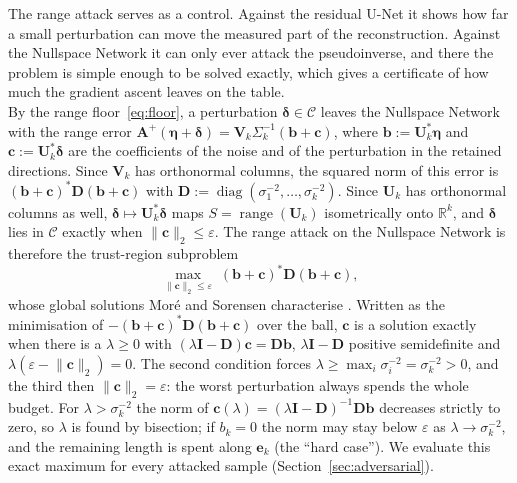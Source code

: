 \documentclass{article}
\numberwithin{equation}{section}
\begin{document}
The range attack serves as a control. Against the residual U-Net it shows how far a small perturbation
can move the measured part of the reconstruction. Against the Nullspace Network it can only ever attack the
pseudoinverse, and there the problem is simple enough to be solved exactly, which gives a certificate of
how much the gradient ascent leaves on the table.\\
By the range floor~\eqref{eq:floor}, a perturbation $\boldsymbol{\delta}\in\mathcal{C}$ leaves the Nullspace
Network with the range error
$\mathbf{A}^{+}(\boldsymbol{\eta}+\boldsymbol{\delta})=\mathbf{V}_k\Sigma_k^{-1}(\mathbf{b}+\mathbf{c})$, where
$\mathbf{b}:=\mathbf{U}_k^{*}\boldsymbol{\eta}$ and $\mathbf{c}:=\mathbf{U}_k^{*}\boldsymbol{\delta}$ are the
coefficients of the noise and of the perturbation in the retained directions. Since $\mathbf{V}_k$ has
orthonormal columns, the squared norm of this error is $(\mathbf{b}+\mathbf{c})^{*}\mathbf{D}(\mathbf{b}+\mathbf{c})$
with $\mathbf{D}:=\operatorname{diag}(\sigma_1^{-2},\dots,\sigma_k^{-2})$. Since $\mathbf{U}_k$ has orthonormal
columns as well, $\boldsymbol{\delta}\mapsto\mathbf{U}_k^{*}\boldsymbol{\delta}$ maps
$S=\operatorname{range}(\mathbf{U}_k)$ isometrically onto $\mathbb{R}^k$, and $\boldsymbol{\delta}$ lies in
$\mathcal{C}$ exactly when $\lVert\mathbf{c}\rVert_2\leq\varepsilon$. The range attack on the Nullspace Network
is therefore the trust-region subproblem
\begin{equation}\label{eq:trs}
\max_{\lVert\mathbf{c}\rVert_2\leq\varepsilon}\;(\mathbf{b}+\mathbf{c})^{*}\mathbf{D}(\mathbf{b}+\mathbf{c}),
\end{equation}
whose global solutions Moré and Sorensen characterise \parencite{more1983trust}. Written as the minimisation
of $-(\mathbf{b}+\mathbf{c})^{*}\mathbf{D}(\mathbf{b}+\mathbf{c})$ over the ball, $\mathbf{c}$ is a solution exactly
when there is a $\lambda\geq0$ with $(\lambda\mathbf{I}-\mathbf{D})\mathbf{c}=\mathbf{D}\mathbf{b}$,
$\lambda\mathbf{I}-\mathbf{D}$ positive semidefinite and $\lambda(\varepsilon-\lVert\mathbf{c}\rVert_2)=0$. The
second condition forces $\lambda\geq\max_i\sigma_i^{-2}=\sigma_k^{-2}>0$, and the third then
$\lVert\mathbf{c}\rVert_2=\varepsilon$: the worst perturbation always spends the whole budget. For
$\lambda>\sigma_k^{-2}$ the norm of $\mathbf{c}(\lambda)=(\lambda\mathbf{I}-\mathbf{D})^{-1}\mathbf{D}\mathbf{b}$
decreases strictly to zero, so $\lambda$ is found by bisection; if $b_k=0$ the norm may stay below
$\varepsilon$ as $\lambda\to\sigma_k^{-2}$, and the remaining length is spent along $\mathbf{e}_k$ (the ``hard
case''). We evaluate this exact maximum for every attacked sample (Section~\ref{sec:adversarial}).
\end{document}
